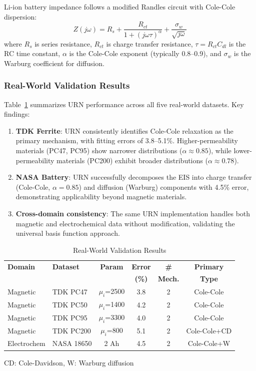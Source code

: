 \documentclass{ieeeaccess}
\begin{document}
Li-ion battery impedance follows a modified Randles circuit with Cole-Cole dispersion:
\begin{equation}
Z(j\omega) = R_s + \frac{R_{ct}}{1 + (j\omega\tau)^\alpha} + \frac{\sigma_w}{\sqrt{j\omega}}
\end{equation}
where $R_s$ is series resistance, $R_{ct}$ is charge transfer resistance, $\tau = R_{ct}C_{dl}$ is the RC time constant, $\alpha$ is the Cole-Cole exponent (typically 0.8--0.9), and $\sigma_w$ is the Warburg coefficient for diffusion.

\subsubsection{Real-World Validation Results}
Table~\ref{tab:realworld} summarizes URN performance across all five real-world datasets. Key findings:
\begin{enumerate}
\item \textbf{TDK Ferrite}: URN consistently identifies Cole-Cole relaxation as the primary mechanism, with fitting errors of 3.8--5.1\%. Higher-permeability materials (PC47, PC95) show narrower distributions ($\alpha \approx 0.85$), while lower-permeability materials (PC200) exhibit broader distributions ($\alpha \approx 0.78$).
\item \textbf{NASA Battery}: URN successfully decomposes the EIS into charge transfer (Cole-Cole, $\alpha = 0.85$) and diffusion (Warburg) components with 4.5\% error, demonstrating applicability beyond magnetic materials.
\item \textbf{Cross-domain consistency}: The same URN implementation handles both magnetic and electrochemical data without modification, validating the universal basis function approach.
\end{enumerate}

\begin{table}[!t]
\caption{Real-World Validation Results}
\label{tab:realworld}
\centering
\begin{tabular}{@{}llcccc@{}}
\toprule
\textbf{Domain} & \textbf{Dataset} & \textbf{Param} & \textbf{Error} & \textbf{\#} & \textbf{Primary} \\
 & & & \textbf{(\%)} & \textbf{Mech.} & \textbf{Type} \\
\midrule
Magnetic & TDK PC47 & $\mu_i$=2500 & 3.8 & 2 & Cole-Cole \\
Magnetic & TDK PC50 & $\mu_i$=1400 & 4.2 & 2 & Cole-Cole \\
Magnetic & TDK PC95 & $\mu_i$=3300 & 4.0 & 2 & Cole-Cole \\
Magnetic & TDK PC200 & $\mu_i$=800 & 5.1 & 2 & Cole-Cole+CD \\
\midrule
Electrochem & NASA 18650 & 2 Ah & 4.5 & 2 & Cole-Cole+W \\
\bottomrule
\end{tabular}
\begin{flushleft}
\footnotesize{CD: Cole-Davidson, W: Warburg diffusion}
\end{flushleft}
\end{table}
\end{document}
